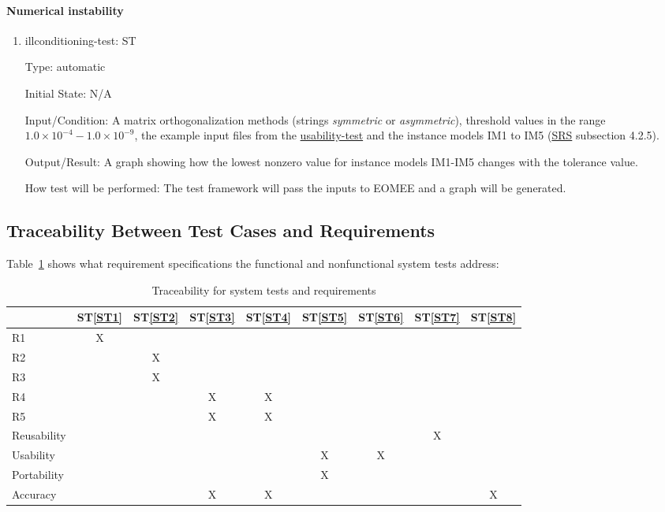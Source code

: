 \documentclass[12pt, titlepage]{article}
\newcounter{systnum} %
\newcommand{\sref}[1]{ST\ref{#1}}
\begin{document}
\paragraph{Numerical instability}

\begin{enumerate}
	
	\item{illconditioning-test: ST\thesystnum 
	\label{ST8}}
	
	Type: automatic
	
	Initial State: N/A
	
	Input/Condition: A matrix orthogonalization methods (strings 
	\textit{symmetric} or \textit{asymmetric}), threshold values in the range 
	$1.0 \times 10^{-4} - 1.0 \times 10^{-9}$, the example input files from the
	\hyperref[section:usability]{usability-test} and the instance models IM1 to 
	IM5 (\href{https://github.com/gabrielasd/eomee/tree/cas741/docs/SRS} {SRS} 
	subsection 4.2.5).
	
	Output/Result: A graph showing how the lowest nonzero value for instance 
	models IM1-IM5 changes with the tolerance value.
	
	How test will be performed: The test framework will pass the inputs to 
	EOMEE and a graph will be generated.
	
\end{enumerate}


\subsection{Traceability Between Test Cases and Requirements}
\label{section:systemtraceability}

Table~\ref{table:traceab} shows what requirement specifications the functional and nonfunctional system tests address:

\begin{table}[ht]
	\centering
	\begin{tabular}{|l|c|c|c|c|c|c|c|c|}
		\hline
		& \sref{ST1}& \sref{ST2}& \sref{ST3}& \sref{ST4}& \sref{ST5}& 
		\sref{ST6}& \sref{ST7}& \sref{ST8}\\	\hline	
	  R1& X& & & & & & &\\ \hline
	  R2&  & X& & & & & &\\ \hline
	  R3&  & X& & & & & &\\ \hline
	  R4&  &  & X& X& & & & \\ \hline
	  R5&  &  & X& X& & & &\\ \hline
	  Reusability& & & & & & &  X& \\ \hline
	  Usability& & & & &   X& X& &\\ \hline
	  Portability& & & &   & X& && \\ \hline
	  Accuracy& & & X& X&  &  & & X\\ \hline
	\end{tabular}
	\caption{Traceability for system tests and requirements}
	\label{table:traceab}
\end{table}
\end{document}
